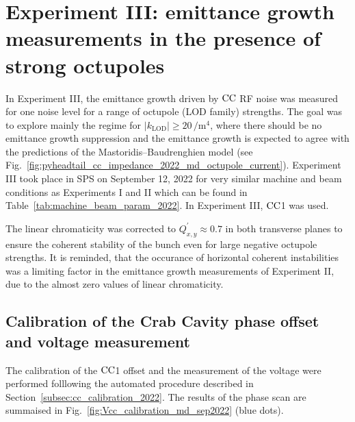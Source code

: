 \section{Experiment III: emittance growth measurements in the presence of strong octupoles}\label{subsec:cc_md_sep_2022_octupole_scan}

In Experiment III, the emittance growth driven by ${\mathrm{CC}}$ RF noise was measured for one noise level for a range of octupole (LOD family) strengths. The goal was to explore mainly the regime for $|k_\mathrm{LOD}| \geq 20$\,$\mathrm{/m^4}$, where there should be no emittance growth suppression and the emittance growth is expected to agree with the predictions of the Mastoridis--Baudrenghien model %
(see Fig.~\ref{fig:pyheadtail_cc_impedance_2022_md_octupole_current}). Experiment III took place in SPS on September 12, 2022 for very similar machine and beam conditions as Experiments I and II which can be found in Table~\ref{tab:machine_beam_param_2022}. In Experiment III, ${\mathrm{CC}}$1 was used.

The linear chromaticity was corrected to $Q^\prime_{x,y} \approx 0.7$ in both transverse planes to ensure the coherent stability of the bunch even for large negative octupole strengths. It is reminded, that the occurance of horizontal coherent instabilities was a limiting factor in the emittance growth measurements of Experiment II, due to the almost zero values of linear chromaticity.


\subsection{Calibration of the Crab Cavity phase offset and voltage measurement}\label{subsec:cc_calibration_2022_exp3}
The calibration of the ${\mathrm{CC}}$1 offset and the measurement of the voltage were performed folllowing the automated procedure described in Section~\ref{subsec:cc_calibration_2022}. The results of the phase scan are summaised in Fig.~\ref{fig:Vcc_calibration_md_sep2022} (blue dots).

